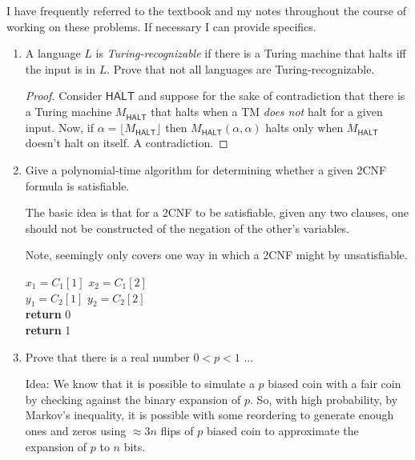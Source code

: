 \documentclass[usletter]{article}
\newcommand{\halt}[0]{
  \overline{\textsf{HALT}}
}
\begin{document}

I have frequently referred to the textbook \cite{textbook} and my notes throughout the course of working on these problems. If necessary I can provide specifics.

\begin{enumerate}
  \item A language $L$ is \textit{Turing-recognizable} if there is a Turing machine that halts iff the input is in $L$. Prove that not all languages are Turing-recognizable.
    \begin{proof}
      Consider $\halt$ and suppose for the sake of contradiction that there is a Turing machine $M_{\halt}$ that halts when a TM \textit{does not} halt for a given input. Now, if $\alpha = \lfloor M_{\halt} \rfloor $ then $M_{\halt}(\alpha, \alpha)$ halts only when $M_{\halt}$ doesn't halt on itself. A contradiction.
    \end{proof}

  \item Give a polynomial-time algorithm for determining whether a given 2CNF formula is satisfiable.

    The basic idea is that for a 2CNF to be satisfiable, given any two clauses, one should not be constructed of the negation of the other's variables.

    Note, seemingly only covers one way in which a 2CNF might by unsatisfiable.

    \begin{algorithm}
      \begin{algorithmic}[1]
        \State $x_1 = C_1[1]$
        \State $x_2 = C_1[2]$ \\
        \State $y_1 = C_2[1]$
        \State $y_2 = C_2[2]$ \\
        \State \textbf{return} 0
        \EndIf
        \EndFor
        \EndFor \\
        \State \textbf{return} 1
        \EndProcedure
      \end{algorithmic}
    \end{algorithm}

  \item Prove that there is a real number $0 < p < 1$ ...

    Idea: We know that it is possible to simulate a $p$ biased coin with a fair coin by checking against the binary expansion of $p$. So, with high probability, by Markov's inequality, it is possible with some reordering to generate enough ones and zeros using $\approx 3n$ flips of $p$ biased coin to approximate the expansion of $p$ to $n$ bits.


\end{enumerate}
\end{document}
